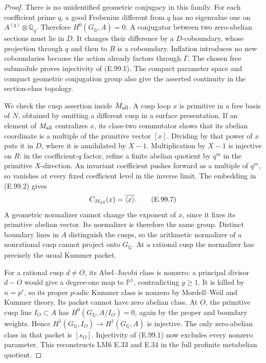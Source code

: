 \begin{proof}
There is no unidentified geometric conjugacy in this family.
For each coefficient prime \(q\), a good Frobenius different from
\(q\) has no eigenvalue one on \(A^{(q)}\otimes\mathbb Q_q\).
Therefore \(H^0(G_{\mathbb Q},A)=0\).  A conjugator between two
zero-abelian sections must lie in \(D\).  It changes their difference
by a \(D\)-coboundary, whose projection through \(q\) and then to
\(B\) is a coboundary.  Inflation introduces no new coboundaries
because the action already factors through \(\Gamma\).  The
chosen free submodule proves injectivity of (E.99.1).  The compact
parameter space and compact geometric conjugation group also give
the asserted continuity in the section-class topology.

We check the cusp assertion inside \(M_{\rm all}\).  A cusp loop
\(x\) is primitive in a free basis of \(N\), obtained by omitting a
different cusp in a surface presentation.  If an element of
\(M_{\rm all}\) centralizes \(x\), its class-two commutator shows
that its abelian coordinate is a multiple of the primitive vector
\([x]\).  Dividing by that power of \(x\) puts it in \(D\), where
it is annihilated by \(X-1\).  Multiplication by \(X-1\) is injective
on \(R\): in the coefficient-\(q\) factor, refine a finite abelian
quotient by \(q^m\) in the primitive \(X\)-direction.  An invariant
coefficient pushes forward as a multiple of \(q^m\), so vanishes
at every fixed coefficient level in the inverse limit.
The embedding in (E.99.2) gives
\[
 C_{M_{\rm all}}(x)=\overline{\langle x\rangle}.
                                                               \tag{E.99.7}
\]
A geometric normalizer cannot change the exponent of \(x\), since
it fixes its primitive abelian vector.  Its normalizer is therefore
the same group.  Distinct boundary lines in \(A\) distinguish the
cusps, so the arithmetic normalizer of a nonrational cusp cannot
project onto \(G_{\mathbb Q}\).  At a rational cusp the normalizer
has precisely the usual Kummer packet.

For a rational cusp \(d\ne O\), its Abel--Jacobi class is nonzero:
a principal divisor \(d-O\) would give a degree-one map to
\(\mathbb P^1\), contradicting \(g\geq1\).  It is killed by
\(n=p^r\), so its proper \(p\)-adic Kummer class is nonzero by
Mordell--Weil and Kummer theory.  Its packet cannot have zero
abelian class.  At \(O\), the primitive cusp line \(I_O\subset A\)
has \(H^0(G_{\mathbb Q},A/I_O)=0\), again by the proper and boundary
weights.  Hence \(H^1(G_{\mathbb Q},I_O)\to H^1(G_{\mathbb Q},A)\)
is injective.  The only zero-abelian class in that packet is
\([s_O]\).  Injectivity of (E.99.1) now excludes every nonzero
parameter.  This reconstructs LM6 E.33 and E.34 in the full
profinite metabelian quotient.


\end{proof}
